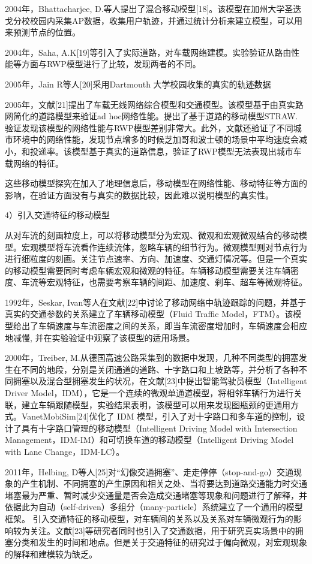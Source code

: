 2004年，Bhattacharjee, D.等人提出了混合移动模型[18]。该模型在加州大学圣迭戈分校校园内采集AP数据，收集用户轨迹，并通过统计分析来建立模型，可以用来预测节点的位置。

2004年，Saha, A.K[19]等引入了实际道路，对车载网络建模。实验验证从路由性能等方面与RWP模型进行了比较，发现两者的不同。

2005年，Jain R等人[20]采用Dartmouth 大学校园收集的真实的轨迹数据

2005年，文献[21]提出了车载无线网络综合模型和交通模型。该模型基于由真实路网简化的道路模型来验证ad hoc网络性能。提出了基于道路的移动模型STRAW. 验证发现该模型的网络性能与RWP模型差别非常大。此外，文献还验证了不同城市环境中的网络性能，发现节点增多的时候芝加哥和波士顿的场景中平均速度会减小，和投递率。该模型基于真实的道路信息，验证了RWP模型无法表现出城市车载网络的特征。

这些移动模型探究在加入了地理信息后，移动模型在网络性能、移动特征等方面的影响，在验证方面没有与真实的数据比较，因此难以说明模型的真实性。
 
4）引入交通特征的移动模型

从对车流的刻画粒度上，可以将移动模型分为宏观、微观和宏观微观结合的移动模型。宏观模型将车流看作连续流体，忽略车辆的细节行为。微观模型则对节点行为进行细粒度的刻画。关注节点速率、方向、加速度、交通灯情况等。但是一个真实的移动模型需要同时考虑车辆宏观和微观的特征。车辆移动模型需要关注车辆密度、车流等宏观特征，也需要考察车辆的间距、加速度、刹车、超车等微观特征。

1992年，Seskar, Ivan等人在文献[22]中讨论了移动网络中轨迹跟踪的问题，并基于真实的交通参数的关系建立了车辆移动模型（Fluid Traffic Model，FTM）。该模型给出了车辆速度与车流密度之间的关系，即当车流密度增加时，车辆速度会相应地减慢, 并在实验验证中观察了该模型的适用场景。

2000年，Treiber, M.从德国高速公路采集到的数据中发现，几种不同类型的拥塞发生在不同的地段，分别是关闭通道的道路、十字路口和上坡路等，并分析了各种不同拥塞以及混合型拥塞发生的状况，在文献[23]中提出智能驾驶员模型（Intelligent Driver Model，IDM），它是一个连续的微观单通道模型，将相邻车辆行为进行关联，建立车辆跟随模型，实验结果表明，该模型可以用来发现图瓶颈的更通用方式。VanetMobiSim[24]优化了 IDM 模型，引入了对十字路口和多车道的控制，设计了具有十字路口管理的移动模型（Intelligent  Driving  Model  with Intersection Management，IDM-IM）和可切换车道的移动模型（Intelligent Driving Model with Lane Change，IDM-LC）。

2011年，Helbing, D等人[25]对“幻像交通拥塞”、走走停停（stop-and-go）交通现象的产生机制、不同拥塞的产生原因和相关之处、当将要达到道路交通能力时交通堵塞最为严重、暂时减少交通量是否会造成交通堵塞等现象和问题进行了解释，并依据此为自动（self-driven）多组分（many-particle）系统建立了一个通用的模型框架。
引入交通特征的移动模型，对车辆间的关系以及关系对车辆微观行为的影响较为关注。文献[23]等研究者同时也引入了交通数据，用于研究真实场景中的拥塞分类和发生的时间和地点。但是关于交通特征的研究过于偏向微观，对宏观现象的解释和建模较为缺乏。


